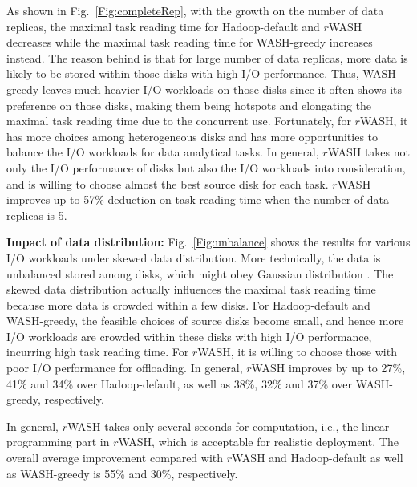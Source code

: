 \documentclass[conference]{IEEEtran}
\begin{document}
As shown in Fig.~\ref{Fig:completeRep}, with the growth on the number of data replicas, the maximal task reading time for Hadoop-default and $r$WASH decreases while the maximal task reading time for WASH-greedy increases instead. The reason behind is that for large number of data replicas, more data is likely to be stored within those disks with high I/O performance. Thus, WASH-greedy leaves much heavier I/O workloads on those disks since it often shows its preference on those disks, making them being hotspots and elongating the maximal task reading time due to the concurrent use. Fortunately, for $r$WASH, it has more choices among heterogeneous disks and has more opportunities to balance the I/O workloads for data analytical tasks. In general, $r$WASH takes not only the I/O performance of disks but also the I/O workloads into consideration, and is willing to choose almost the best source disk for each task. $r$WASH improves up to 57\% deduction on task reading time when the number of data replicas is 5.

 \textbf{Impact of data distribution:} Fig.~\ref{Fig:unbalance} shows the results for various I/O workloads under skewed data distribution. More technically, the data is unbalanced stored among disks, which might obey Gaussian distribution \cite{b44}. The skewed data distribution actually influences the maximal task reading time because more data is crowded within a few disks. For Hadoop-default and WASH-greedy, the feasible choices of source disks become small, and hence more I/O workloads are crowded within these disks with high I/O performance, incurring high task reading time. For $r$WASH, it is willing to choose those with poor I/O performance for offloading. In general, $r$WASH improves by up to 27\%, 41\% and 34\% over Hadoop-default, as well as 38\%, 32\% and 37\% over WASH-greedy, respectively.


In general, $r$WASH takes only several seconds for computation, i.e., the linear programming part in $r$WASH, which is acceptable for realistic deployment. The overall average improvement compared with $r$WASH and Hadoop-default as well as WASH-greedy is 55\% and 30\%, respectively.
\end{document}
